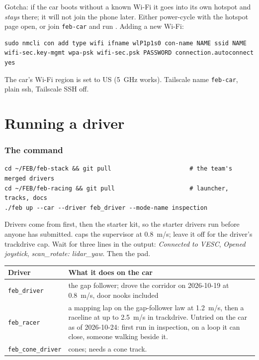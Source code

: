 \documentclass[11pt,a4paper]{article}
\begin{document}
\medskip
Gotcha: if the car boots without a known Wi-Fi it goes into its own hotspot and \emph{stays} there; it will not
join the phone later. Either power-cycle with the hotspot page open, or join \texttt{feb-car} and run
. Adding a new Wi-Fi:

\begin{lstlisting}
sudo nmcli con add type wifi ifname wlP1p1s0 con-name NAME ssid NAME wifi-sec.key-mgmt wpa-psk wifi-sec.psk PASSWORD connection.autoconnect yes
\end{lstlisting}

The car's Wi-Fi region is set to US (5~GHz works). Tailscale name \texttt{feb-car}, plain ssh, Tailscale SSH off.

\part{Running a driver}

\section{The command}

\begin{lstlisting}
cd ~/FEB/feb-stack && git pull                      # the team's merged drivers
cd ~/FEB/feb-racing && git pull                     # launcher, tracks, docs
./feb up --car --driver feb_driver --mode-name inspection
\end{lstlisting}

Drivers come from  first, then the starter kit, so the starter drivers run before anyone
has submitted.  caps the supervisor at 0.8~m/s; leave it off for the driver's
trackdrive cap. Wait for three lines in the output: \emph{Connected to VESC}, \emph{Opened joystick},
\emph{scan\_rotate: lidar\_yaw}. Then the pad.

\begin{tabularx}{\linewidth}{lX}
\toprule
Driver & What it does on the car \\
\midrule
\texttt{feb\_driver} & the gap follower; drove the corridor on 2026-10-19 at 0.8~m/s, door nooks included \\
\texttt{feb\_racer} & a mapping lap on the gap-follower law at 1.2~m/s, then a raceline at up to 2.5~m/s in trackdrive. Untried on the car as of 2026-10-24: first run in inspection, on a loop it can close, someone walking beside it. \\
\texttt{feb\_cone\_driver} & cones; needs a cone track. \\
\bottomrule
\end{tabularx}
\end{document}
